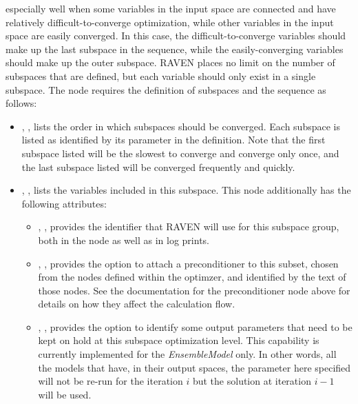 \begin{itemize}
        especially well when some variables in the input space are connected and have relatively
        difficult-to-converge optimization, while other variables in the input space are easily converged.  In
        this case, the difficult-to-converge variables should make up the last subspace in the sequence, while
        the easily-converging variables should make up the outer subspace.
        RAVEN places no limit on the
        number of subspaces that are defined, but each variable should only exist in a single subspace.
        The  node requires the definition of subspaces and the sequence as follows:
        \begin{itemize}
          \item {}, , lists the order in
            which subspaces should be converged.  Each subspace is listed as identified by its 
            parameter in the  definition.  Note that the first subspace listed will be the
            slowest to converge and converge only once, and the last subspace listed will be converged
            frequently and quickly.
          \item {}, , lists the variables
            included in this subspace.  This node additionally has the following attributes:
            \begin{itemize}
              \item {}, , provides the identifier that RAVEN
                will use for this subspace group, both in the  node as well as in log
                prints.
              \item {}, , provides the option to attach
                a preconditioner to this subset, chosen from the  nodes defined within
                the optimzer, and identified by the text of those nodes.  See the documentation for the
                preconditioner node above for details on how they affect the calculation flow.
              \item {}, , provides the option to identify some output parameters that
              need to be kept on hold at this subspace optimization level. This capability is
              currently implemented for the \textit{EnsembleModel} only.  In other words,
              all the models that have, in their output spaces, the parameter here specified
              will not be re-run for the iteration $i$ but the solution at iteration $i-1$ will be
              used.
            \end{itemize}
        \end{itemize}

\end{itemize}

